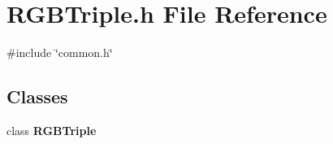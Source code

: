 \section{R\+G\+B\+Triple.\+h File Reference}
\label{RGBTriple_8h}
{\ttfamily \#include \char`\"{}common.\+h\char`\"{}}\newline
\subsection*{Classes}
\begin{DoxyCompactItemize}
\item 
class \textbf{ R\+G\+B\+Triple}
\end{DoxyCompactItemize}
